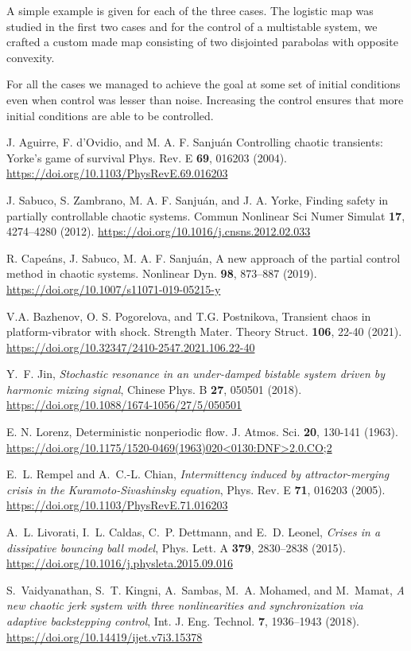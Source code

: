 A simple example is given for each of the three cases. The logistic map was studied in the first two cases and for the control of a multistable system, we crafted a custom made map consisting of two disjointed parabolas with opposite convexity.

For all the cases we managed to achieve the goal at some set of initial conditions even when control was lesser than noise. Increasing the control ensures that more initial conditions are able to be controlled.



\begin{thebibliography}{05}

J. Aguirre, F. d’Ovidio, and M. A. F. Sanjuán
Controlling chaotic transients: Yorke’s game of survival
Phys. Rev. E \textbf{69}, 016203 
(2004).
\url{https://doi.org/10.1103/PhysRevE.69.016203}

J. Sabuco, S. Zambrano, M. A. F. Sanjuán, and J. A. Yorke,
Finding safety in partially controllable chaotic systems.
Commun Nonlinear Sci Numer Simulat \textbf{17}, 4274–4280 
(2012).
\url{https://doi.org/10.1016/j.cnsns.2012.02.033}

R. Capeáns, J. Sabuco, M. A. F. Sanjuán,
A new approach of the partial control method in chaotic
systems.
Nonlinear Dyn. \textbf{98}, 873–887 
(2019). 
\url{https://doi.org/10.1007/s11071-019-05215-y}



V.A. Bazhenov, O. S. Pogorelova, and T.G. Postnikova,
Transient chaos in platform-vibrator with shock.
Strength Mater. Theory Struct. \textbf{106}, 22-40 
(2021).
\url{https://doi.org/10.32347/2410-2547.2021.106.22-40}

Y.~F. Jin,
{\em Stochastic resonance in an under-damped bistable system driven by harmonic mixing signal}, 
Chinese Phys. B \textbf{27}, 050501 
(2018).
\url{https://doi.org/10.1088/1674-1056/27/5/050501}

E. N. Lorenz,
Deterministic nonperiodic flow.
J. Atmos. Sci. \textbf{20}, 130-141 
(1963).
\url{https://doi.org/10.1175/1520-0469(1963)020<0130:DNF>2.0.CO;2}


E.~L. Rempel and A.~C.-L. Chian, 
{\em Intermittency induced by attractor-merging crisis in the Kuramoto-Sivashinsky equation}, 
Phys. Rev. E \textbf{71}, 016203 
(2005).
\url{https://doi.org/10.1103/PhysRevE.71.016203}

A.~L. Livorati, I.~L. Caldas, C.~P. Dettmann, and E.~D. Leonel,
{\em Crises in a dissipative bouncing ball model},
Phys. Lett. A \textbf{379}, 2830--2838 
(2015).
\url{https://doi.org/10.1016/j.physleta.2015.09.016}

S.~Vaidyanathan, S.~T. Kingni, A.~Sambas, M.~A. Mohamed, and M.~Mamat,
{\em A new chaotic jerk system with three nonlinearities and synchronization via adaptive backstepping control},
Int. J. Eng. Technol. \textbf{7}, 1936--1943 
(2018).
\url{https://doi.org/10.14419/ijet.v7i3.15378
}



\end{thebibliography}